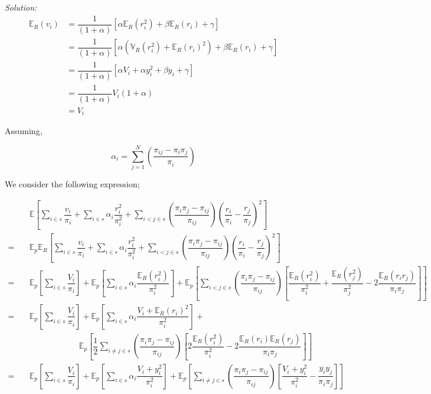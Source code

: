 \documentclass[12pt]{article}
\newcommand{\E}{\mathbb{E}}
\newcommand{\Var}{\mathbb{V}}
\theoremstyle{definition}
\newenvironment{answer}{\textit{Solution: }\quad }{ \hfill \qedsymbol}
\begin{document}
\begin{answer}
	\begin{align*}
		\E_R(v_i)
		& = \dfrac{1}{(1 + \alpha)} \left[ \alpha \E_R(r_i^2) + \beta \E_R(r_i) + \gamma \right]\\
		& = \dfrac{1}{(1 + \alpha)} \left[ \alpha (\Var_R(r_i^2) + \E_R(r_i)^2) + \beta \E_R(r_i) + \gamma \right]\\
		& = \dfrac{1}{(1 + \alpha)} \left[ \alpha V_i + \alpha y_i^2 + \beta y_i + \gamma \right]\\
		& = \dfrac{1}{(1 + \alpha)} V_i (1 + \alpha)\\
		& = V_i
	\end{align*}

	Assuming, 

	$$\alpha_i = \sum_{j=1}^{N} \left( \dfrac{\pi_{ij} - \pi_i \pi_j}{\pi_i} \right)$$

	We consider the following expression;

	\begin{align*}
		& \E\left[ \sum_{i \in s} \dfrac{v_i}{\pi_i} +  \sum_{i \in s} \alpha_i \dfrac{r_i^2}{\pi_i^2} + \sum_{i < j \in s} \left( \dfrac{\pi_i \pi_j - \pi_{ij}}{\pi_{ij}} \right) \left( \dfrac{r_i}{\pi_i} - \dfrac{r_j}{\pi_j} \right)^2 \right]\\
		= \quad & \E_p \E_R \left[ \sum_{i \in s} \dfrac{v_i}{\pi_i} + \sum_{i \in s} \alpha_i \dfrac{r_i^2}{\pi_i^2} + \sum_{i < j \in s} \left( \dfrac{\pi_i \pi_j - \pi_{ij}}{\pi_{ij}} \right) \left( \dfrac{r_i}{\pi_i} - \dfrac{r_j}{\pi_j} \right)^2 \right] \\
		= \quad & \E_p \left[ \sum_{i \in s} \dfrac{V_i}{\pi_i} \right] + \E_p \left[ \sum_{i \in s} \alpha_i \dfrac{\E_R(r_i^2)}{\pi_i^2} \right] + \E_p \left[ \sum_{i < j \in s} \left( \dfrac{\pi_i \pi_j - \pi_{ij}}{\pi_{ij}} \right) \left[ \dfrac{\E_R(r_i^2)}{\pi_i^2} + \dfrac{\E_R(r_j^2)}{\pi_j^2} - 2\dfrac{\E_R(r_ir_j)}{\pi_i \pi_j} \right] \right] \\
		= \quad & \E_p \left[ \sum_{i \in s} \dfrac{V_i}{\pi_i} \right] + \E_p \left[ \sum_{i \in s} \alpha_i \dfrac{V_i + \E_R(r_i)^2}{\pi_i^2} \right] + \\
		& \qquad \qquad \qquad \E_p \left[ \dfrac{1}{2} \sum_{i \neq j \in s} \left( \dfrac{\pi_i \pi_j - \pi_{ij}}{\pi_{ij}} \right) \left[ 2\dfrac{\E_R(r_i^2)}{\pi_i^2} - 2\dfrac{\E_R(r_i)\E_R(r_j)}{\pi_i \pi_j} \right] \right] \\
		= \quad & \E_p \left[ \sum_{i \in s} \dfrac{V_i}{\pi_i} \right] + \E_p \left[ \sum_{i \in s}\alpha_i \dfrac{V_i + y_i^2}{\pi_i^2} \right] + \E_p \left[ \sum_{i \neq j \in s} \left( \dfrac{\pi_i \pi_j - \pi_{ij}}{\pi_{ij}} \right) \left[ \dfrac{V_i + y_i^2}{\pi_i^2} - \dfrac{y_i y_j}{\pi_i \pi_j} \right] \right]\\
	\end{align*}


\end{answer}
\end{document}
